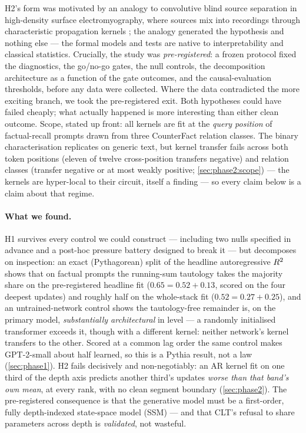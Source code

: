 H2's form was motivated by an analogy to convolutive blind source
separation in high-density surface electromyography, where sources mix into
recordings through characteristic propagation kernels
\citep{holobar2007multichannel}; the analogy generated the hypothesis and
nothing else --- the formal models and tests are native to interpretability
and classical statistics. Crucially, the study was \emph{pre-registered}: a
frozen protocol fixed the diagnostics, the go/no-go gates, the null controls,
the decomposition architecture as a function of the gate outcomes, and the
causal-evaluation thresholds, before any data were collected. Where the data
contradicted the more exciting branch, we took the pre-registered exit. Both
hypotheses could have failed cheaply; what actually happened is more
interesting than either clean outcome. Scope, stated up front: all kernels
are fit at the \emph{query position} of factual-recall prompts drawn from
three CounterFact relation classes. The binary characterisation replicates on
generic text, but kernel transfer fails across both token positions (eleven of
twelve cross-position transfers negative) and relation classes (transfer
negative or at
most weakly positive; \cref{sec:phase2:scope}) --- the kernels are hyper-local to their
circuit, itself a finding --- so every claim below is a claim about that
regime.

\paragraph{What we found.} H1 survives every control we could construct ---
including two nulls specified in advance and a post-hoc pressure battery
designed to break it --- but decomposes on inspection: an exact
(Pythagorean) split of the headline autoregressive $R^2$ shows that on
factual prompts the running-sum tautology takes the majority share on the
pre-registered headline fit ($0.65 = 0.52 + 0.13$, scored on the four deepest
updates) and roughly half on the whole-stack fit
($0.52 = 0.27 + 0.25$), and an
untrained-network control shows the tautology-free remainder is, on the
primary model, \emph{substantially architectural} in level --- a randomly
initialised transformer exceeds it, though with a different kernel: neither
network's kernel transfers to the other. Scored at a common lag order the same control makes
GPT-2-small about half learned, so this is a Pythia result, not a law
(\cref{sec:phase1}). H2 fails decisively and non-negotiably: an AR kernel fit
on one third of the depth axis predicts another third's updates \emph{worse
than that band's own mean}, at every rank, with no clean segment boundary
(\cref{sec:phase2}). The pre-registered consequence is that the generative
model must be a first-order, fully depth-indexed state-space model (SSM) ---
and that CLT's refusal to share parameters across depth is \emph{validated},
not wasteful.


